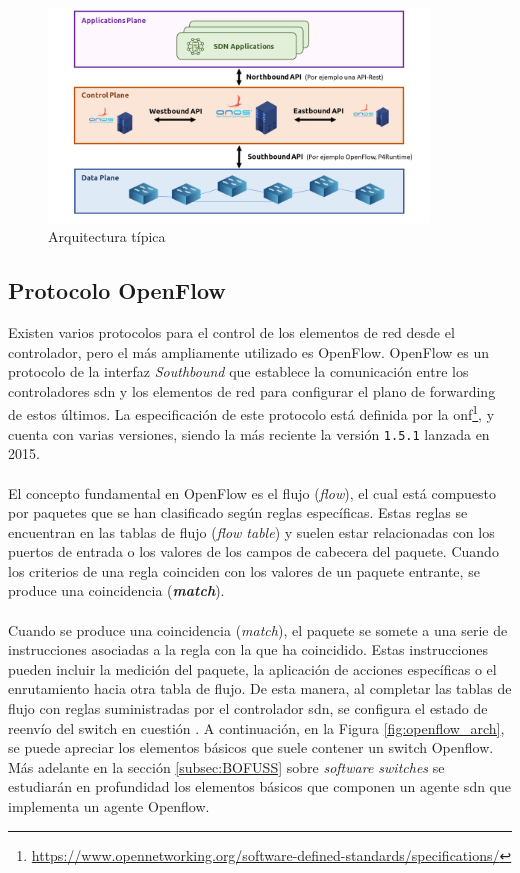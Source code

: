 \begin{figure}[ht]
    \centering
    \includegraphics[width=0.9\textwidth]{archivos/img/teoria/sdn_arch.png}
    \caption{Arquitectura típica  \cite{carrascal2020diseno}}
    \label{fig:sdnBasicArch}
\end{figure}


\subsection{Protocolo OpenFlow}

Existen varios protocolos para el control de los elementos de red desde el controlador, pero el más ampliamente utilizado es OpenFlow. OpenFlow es un protocolo de la interfaz \textit{Southbound} que establece la comunicación entre los controladores \gls{sdn} y los elementos de red para configurar el plano de forwarding de estos últimos. La especificación de este protocolo está definida por la \gls{onf}\footnote{\url{https://www.opennetworking.org/software-defined-standards/specifications/}}, y cuenta con varias versiones, siendo la más reciente la versión \texttt{1.5.1} lanzada en 2015.\\
\\
El concepto fundamental en OpenFlow es el flujo (\textit{flow}), el cual está compuesto por paquetes que se han clasificado según reglas específicas. Estas reglas se encuentran en las tablas de flujo (\textit{flow table}) y suelen estar relacionadas con los puertos de entrada o los valores de los campos de cabecera del paquete. Cuando los criterios de una regla coinciden con los valores de un paquete entrante, se produce una coincidencia (\textbf{\textit{match}}).\\
\\
Cuando se produce una coincidencia (\textit{match}), el paquete se somete a una serie de instrucciones asociadas a la regla con la que ha coincidido. Estas instrucciones pueden incluir la medición del paquete, la aplicación de acciones específicas o el enrutamiento hacia otra tabla de flujo. De esta manera, al completar las tablas de flujo con reglas suministradas por el controlador \gls{sdn}, se configura el estado de reenvío del switch en cuestión \cite{nadeau2013sdn}. A continuación, en la Figura \ref{fig:openflow_arch}, se puede apreciar los elementos básicos que suele contener un switch Openflow. Más adelante en la sección \ref{subsec:BOFUSS} sobre \textit{software switches} se estudiarán en profundidad los elementos básicos que componen un agente \gls{sdn} que implementa un agente Openflow.


